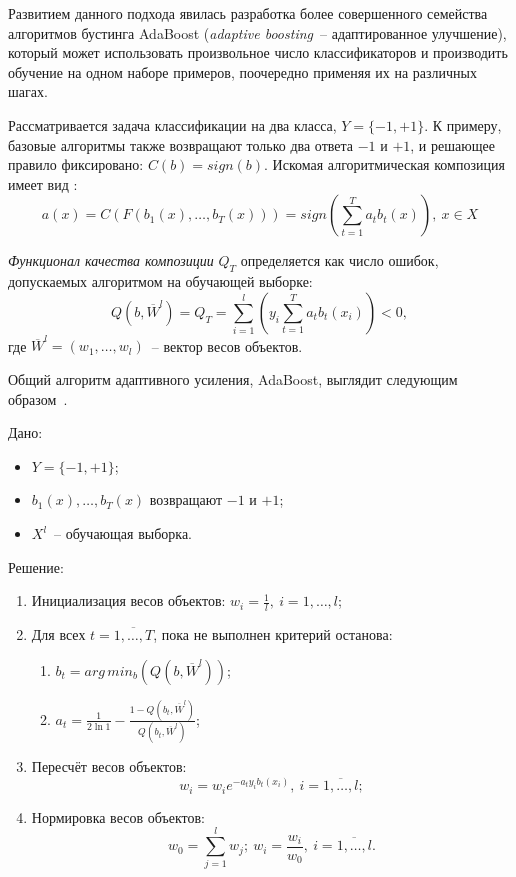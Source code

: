 Развитием данного подхода явилась разработка более совершенного семейства алгоритмов бустинга AdaBoost (\textit{adaptive boosting}~--
адаптированное улучшение), который может использовать произвольное число классификаторов и производить обучение на одном наборе
примеров, поочередно применяя их на различных шагах.

Рассматривается задача классификации на два класса, $Y = \lbrace  -1,+1 \rbrace$. К примеру, базовые алгоритмы также возвращают только два ответа
$-1$ и $+1$, и решающее правило фиксировано: $C(b) = sign(b)$. Искомая алгоритмическая композиция имеет вид \cite{viola_jones_2}:
\begin{equation}
    a(x) = C(F(b_1(x), \dots, b_T(x))) = sign(\sum_{t=1}^Ta_tb_t(x)),\ x\in X
\end{equation}

\textit{Функционал качества композиции} $Q_T$ определяется как число ошибок, допускаемых алгоритмом на обучающей выборке:
\begin{equation}
    Q(b, \overline{W}^l) = Q_T = \sum_{i=1}^l(y_i\sum_{t=1}^Ta_tb_t(x_i))<0,
\end{equation}
где $\overline{W}^l = (w_1,\dots,w_l)$~-- вектор весов объектов.

Общий алгоритм адаптивного усиления, AdaBoost, выглядит следующим образом~\cite{viola_jones_2}.

Дано:
\begin{itemize}
    \item $ Y = \lbrace -1,+1 \rbrace $;
    \item $b_1(x), \dots, b_T(x) $ возвращают $-1$ и $+1$;
    \item $X^l$~-- обучающая выборка.
\end{itemize}

Решение:
\begin{enumerate}
    \item Инициализация весов объектов: $w_i=\frac{1}{l},\ i=1,\dots,l$;
    \item Для всех $ t = \overline{1, \dots, T}$, пока не выполнен критерий останова:
        \begin{enumerate}
            \item $ b_t = arg\,min_b(Q(b, \overline{W}^l)) $;
            \item $ a_t = \frac{1}{2\ln1} - \frac{1 - Q(b_t, \overline{W}^l)}{Q(b_t, \overline{W}^l)} $;
        \end{enumerate}
    \item Пересчёт весов объектов: $$ w_i = w_i e^{-a_ty_ib_t(x_i)},\ i=\overline{1,\dots,l}; $$
    \item Нормировка весов объектов: $$ w_0 = \sum_{j=1}^lw_j;\ w_i=\frac{w_i}{w_0},\ i=\overline{1,\dots,l}. $$
\end{enumerate}

